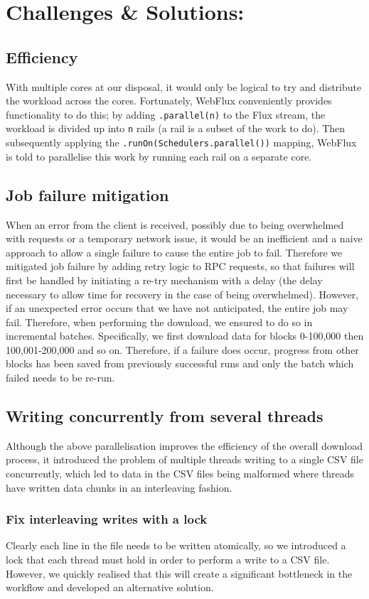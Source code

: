 \section{Challenges \& Solutions:}
\subsection{Efficiency}
With multiple cores at our disposal, it would only be logical to try and distribute the workload across the cores. Fortunately, WebFlux conveniently provides functionality to do this; by adding \texttt{.parallel(n)} to the Flux stream, the workload is divided up into \texttt{n} rails (a rail is a subset of the work to do). Then subsequently applying the \texttt{.runOn(Schedulers.parallel())} mapping, WebFlux is told to parallelise this work by running each rail on a separate core. 
\subsection{Job failure mitigation}
When an error from the client is received, possibly due to being overwhelmed with requests or a temporary network issue, it would be an inefficient and a naive approach to allow a single failure to cause the entire job to fail. Therefore we mitigated job failure by adding retry logic to RPC requests, so that failures will first be handled by initiating a re-try mechanism with a delay (the delay necessary to allow time for recovery in the case of being overwhelmed). However, if an unexpected error occurs that we have not anticipated, the entire job may fail. Therefore, when performing the download, we ensured to do so in incremental batches. Specifically, we first download data for blocks 0-100,000 then 100,001-200,000 and so on. Therefore, if a failure does occur, progress from other blocks has been saved from previously successful runs and only the batch which failed needs to be re-run. 

\subsection{Writing concurrently from several threads}
Although the above parallelisation improves the efficiency of the overall download process, it introduced the problem of multiple threads writing to a single CSV file concurrently, which led to data in the CSV files being malformed where threads have written data chunks in an interleaving fashion. 

\subsubsection{Fix interleaving writes with a lock} 
Clearly each line in the file needs to be written atomically, so we introduced a lock that each thread must hold in order to perform a write to a CSV file. However, we quickly realised that this will create a significant bottleneck in the workflow and developed an alternative solution.

